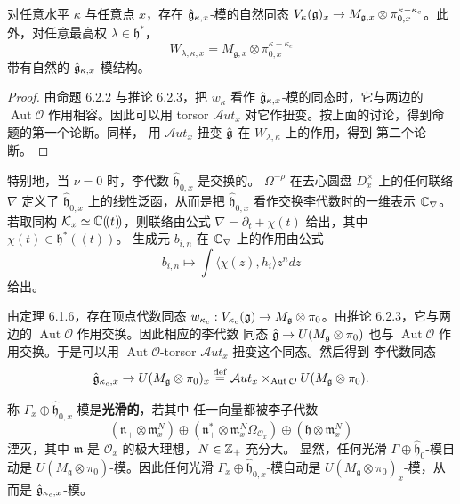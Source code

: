 \renewcommand{\theproposition}{6.2.4}
\begin{proposition}
    对任意水平 $\kappa$ 与任意点 $x$，存在
    $\hat{\mathfrak{g}}_{\kappa,x}$-模的自然同态
    $V_\kappa(\mathfrak{g})_x\to M_{\mathfrak g,x}\otimes
    \pi^{\kappa-\kappa_c}_{0,x}$。此外，对任意最高权 $\lambda\in\mathfrak h^*$，
    \[
        W_{\lambda,\kappa,x}=M_{\mathfrak g,x}\otimes
        \pi^{\kappa-\kappa_c}_{0,x}
    \]
    带有自然的 $\hat{\mathfrak{g}}_{\kappa,x}$-模结构。
\end{proposition}

\begin{proof}
    由命题 6.2.2 与推论 6.2.3，把 $w_\kappa$ 看作
    $\hat{\mathfrak{g}}_{\kappa,x}$-模的同态时，它与两边的
    $\operatorname{Aut}\mathcal O$ 作用相容。因此可以用 torsor
    $\mathcal Aut_x$ 对它作扭变。按上面的讨论，得到命题的第一个论断。同样，
    用 $\mathcal Aut_x$ 扭变 $\hat{\mathfrak{g}}$ 在 $W_{\lambda,\kappa}$ 上的作用，得到
    第二个论断。
\end{proof}

特别地，当 $\nu=0$ 时，李代数 $\widehat{\mathfrak h}_{0,x}$ 是交换的。
$\Omega^{-\rho}$ 在去心圆盘 $D^\times_x$ 上的任何联络 $\nabla$ 定义了
$\widehat{\mathfrak h}_{0,x}$ 上的线性泛函，从而是把
$\widehat{\mathfrak h}_{0,x}$ 看作交换李代数时的一维表示
$\mathbb{C}_\nabla$。若取同构 $\mathcal{K}_x\simeq\mathbb{C}(\!(t)\!)$，则联络由公式
$\nabla=\partial_t+\chi(t)$ 给出，其中 $\chi(t)\in\mathfrak h^*(\!(t)\!)$。
生成元 $b_{i,n}$ 在 $\mathbb{C}_\nabla$ 上的作用由公式
\[
    b_{i,n}\mapsto\int\langle\chi(z),h_i\rangle z^n dz
\]
给出。

由定理 6.1.6，存在顶点代数同态
$w_{\kappa_c}:V_{\kappa_c}(\mathfrak{g})\to M_{\mathfrak g}\otimes\pi_0$。由推论
6.2.3，它与两边的 $\operatorname{Aut}\mathcal O$ 作用交换。因此相应的李代数
同态 $\hat{\mathfrak{g}}\to U(M_{\mathfrak g}\otimes\pi_0)$ 也与
$\operatorname{Aut}\mathcal O$ 作用交换。于是可以用
$\operatorname{Aut}\mathcal O$-torsor $\mathcal Aut_x$ 扭变这个同态。然后得到
李代数同态
\[
    \hat{\mathfrak{g}}_{\kappa_c,x}\to U(M_{\mathfrak g}\otimes\pi_0)_x
    \overset{\mathrm{def}}{=}\mathcal Aut_x
    \times_{\operatorname{Aut}\mathcal O}U(M_{\mathfrak g}\otimes\pi_0).
\]

称 $\Gamma_x\oplus\widehat{\mathfrak h}_{0,x}$-模是\textbf{光滑的}，若其中
任一向量都被李子代数
\[
    (\mathfrak n_+\otimes\mathfrak m^N_x)
    \oplus(\mathfrak n^*_+\otimes\mathfrak m^N_x\Omega_{\mathcal O_x})
    \oplus(\mathfrak h\otimes\mathfrak m^N_x)
\]
湮灭，其中 $\mathfrak m$ 是 $\mathcal O_x$ 的极大理想，$N\in\mathbb{Z}_+$ 充分大。
显然，任何光滑 $\Gamma\oplus\widehat{\mathfrak h}_0$-模自动是
$U(M_{\mathfrak g}\otimes\pi_0)$-模。因此任何光滑
$\Gamma_x\oplus\widehat{\mathfrak h}_{0,x}$-模自动是
$U(M_{\mathfrak g}\otimes\pi_0)_x$-模，从而是
$\hat{\mathfrak{g}}_{\kappa_c,x}$-模。

